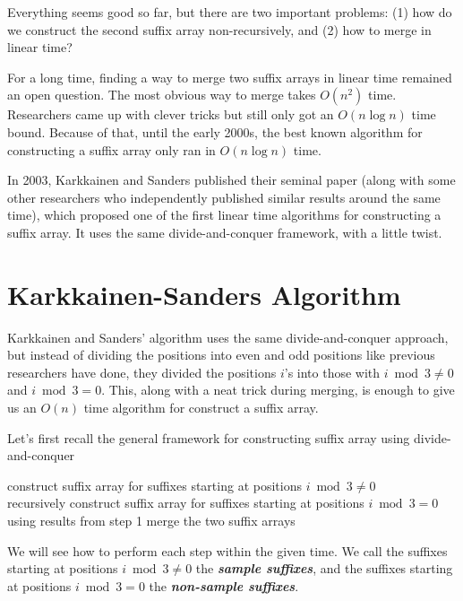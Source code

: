  Everything seems good so far, but there are two important problems: (1) how do we construct the second suffix array non-recursively, and (2) how to merge in linear time?

For a long time, finding a way to merge two suffix arrays in linear time remained an open question. The most obvious way to merge takes $O(n^2)$ time. Researchers came up with clever tricks but still only got an $O(n \log n)$ time bound. Because of that, until the early 2000s, the best known algorithm for constructing a suffix array only ran in $O(n \log n)$ time.

In 2003, Karkkainen and Sanders published their seminal paper (along with some other researchers who independently published similar results around the same time), which proposed one of the first linear time algorithms for constructing a suffix array. It uses the same divide-and-conquer framework, with a little twist.

\section{Karkkainen-Sanders Algorithm}

Karkkainen and Sanders' algorithm uses the same divide-and-conquer approach, but instead of dividing the positions into even and odd positions like previous researchers have done, they divided the positions $i$'s into those with $i \bmod 3 \neq 0$ and $i \bmod 3 = 0$. This, along with a neat trick during merging, is enough to give us an $O(n)$ time algorithm for construct a suffix array.

Let's first recall the general framework for constructing suffix array using divide-and-conquer

\begin{codebox}
    \li construct suffix array for suffixes starting at positions $i \bmod 3 \neq 0$ \\recursively {}
    \li construct suffix array for suffixes starting at positions $i \bmod 3 = 0$ \\ using results from step 1 
    \li merge the two suffix arrays 
\end{codebox}

We will see how to perform each step within the given time. We call the suffixes starting at positions $i \bmod 3 \neq 0$ the \textit{\textbf{sample suffixes}}, and the suffixes starting at positions $i \bmod 3 = 0$ the \textit{\textbf{non-sample suffixes}}.

